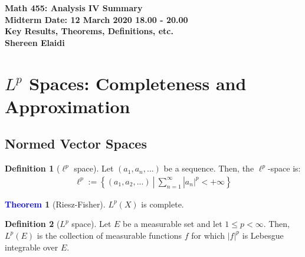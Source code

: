 \documentclass[11pt]{article}
\theoremstyle{definition}
\theoremstyle{definition}
\newcommand{\sets}[2]{ \left\{ #1\ |\ #2 \right\}}
\newtheorem{theorem}{\textcolor{blue}{Theorem}}
\theoremstyle{definition}
\newtheorem{definition}{\textcolor{OliveGreen}{Definition}}
\theoremstyle{remark}
\begin{document}
\begin{center}
	\textbf{Math 455: Analysis IV Summary} \\
	\textbf{Midterm Date: 12 March 2020 18.00 - 20.00} \\
	\textbf{Key Results, Theorems, Definitions, etc.} \\
	\textbf{Shereen Elaidi}
\end{center}

\begin{abstract}
	This document contains a summary of all the key definitions, results, and theorems from class. There are probably typos, and so I would be grateful if you brought those to my attention :-). 
	
	Syllabus: $L^p$ space, duality, weak convergence, Young, Holder, and Minkowski inequalities, point-set topology, topological space, dense sets, completeness, compactness, connectedness, path-connectedness, separability, Tychnoff theorem, Stone-Weierstrass Theorem, Arzela-Ascoli, Baire category theorem, open mapping theorem, closed graph theorem, uniform boudnedness principle, Hahn Banch theorem. 
\end{abstract}

\tableofcontents

\section{$L^p$ Spaces: Completeness and Approximation}
\subsection{Normed Vector Spaces}

\begin{definition}[$\ell^p$ space]
	Let $(a_1, a_n, ...)$ be a sequence. Then, the $\ell^p$-space is: 
	\begin{align}
		\ell^p := \sets{(a_1, a_2, ...)}{\sum_{n=1}^\infty |a_n|^p < +\infty}
	\end{align}
\end{definition}

\begin{theorem}[Riesz-Fisher] 
	$L^p(X)$ is complete. 
\end{theorem}

\begin{definition}[$L^p$ space]
	Let $E$ be a measurable set and let $1 \leq p < \infty$. Then, $L^p(E)$ is the collection of measurable functions $f$ for which $|f|^p$ is Lebesgue integrable over $E$. 
\end{definition}
\end{document}
